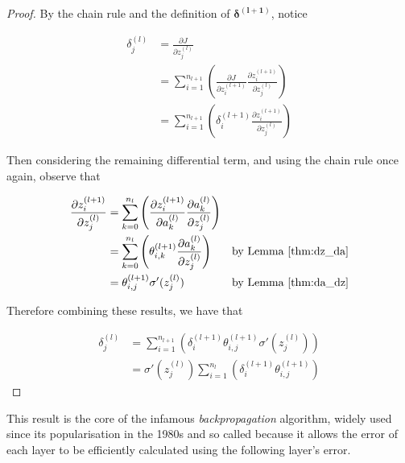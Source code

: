 \documentclass{article}[11pt]
\begin{document}
        \begin{proof}
            
            By the chain rule and the definition of $\boldsymbol{\delta^{(l+1)}}$, notice
            
            $$ \begin{aligned}
            \delta^{(l)}_j
            &= \frac{\partial J}{\partial z^{(l)}_j} \\
            &= \sum_{i=1}^{n_{l+1}} \left( \frac{\partial J}{\partial z^{(l+1)}_i} \frac{\partial z^{(l+1)}_i}{\partial z^{(l)}_j} \right) \\
            &= \sum_{i=1}^{n_{l+1}} \left( \delta^{(l+1)}_i \frac{\partial z^{(l+1)}_i}{\partial z^{(l)}_j} \right)
            \end{aligned} $$
            
            Then considering the remaining differential term, and using the chain rule once again, observe that
            
            $$ \begin{aligned}
            \frac{\partial z^{(l+1)}_i}{\partial z^{(l)}_j}
            &= \sum_{k=0}^{n_l} \left( \frac{\partial z^{(l+1)}_i}{\partial a^{(l)}_k} \frac{\partial a^{(l)}_k}{\partial z^{(l)}_j} \right) \\
            &= \sum_{k=0}^{n_l} \left( \theta^{(l+1)}_{i,k} \frac{\partial a^{(l)}_k}{\partial z^{(l)}_j} \right) & \text{by Lemma \ref{thm:dz_da}} \\
            &= \theta^{(l+1)}_{i,j} \sigma'(z^{(l)}_j) & \text{by Lemma \ref{thm:da_dz}}
            \end{aligned} $$
            
            Therefore combining these results, we have that
            
            $$ \begin{aligned}
            \delta^{(l)}_j
            &= \sum_{i=1}^{n_{l+1}} \left( \delta^{(l+1)}_i \theta^{(l+1)}_{i,j} \sigma'(z^{(l)}_j) \right) \\
            &= \sigma'(z^{(l)}_j) \sum_{i=1}^{n_l} \left( \delta^{(l+1)}_i \theta^{(l+1)}_{i,j} \right)
            \end{aligned} $$
            
        \end{proof}
    
    
        This result is the core of the infamous \textit{backpropagation} algorithm, widely used since its popularisation in the 1980s \cite{hinton_backprop} and so called because it allows the error of each layer to be efficiently calculated using the following layer's error.
        
\end{document}
